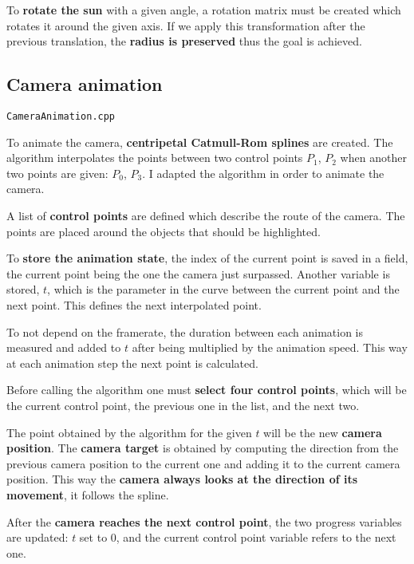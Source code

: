 To \textbf{rotate the sun }with a given angle, a rotation matrix must be created which rotates it around the given axis. If we apply this transformation after the previous translation, the \textbf{radius is preserved} thus the goal is achieved.







\subsection{Camera animation}

\verb|CameraAnimation.cpp|

To animate the camera, \textbf{centripetal Catmull-Rom splines} \cite{splineCatmullRom} are created. The algorithm interpolates the points between two control points $P_1$, $P_2$ when another two points are given: $P_0$, $P_3$. I adapted the algorithm in order to animate the camera. 

A list of \textbf{control points} are defined which describe the route of the camera. The points are placed around the objects that should be highlighted.

To \textbf{store the animation state}, the index of the current point is saved in a field, the current point being the one the camera just surpassed. Another variable is stored, $t$, which is the parameter in the curve between the current point and the next point. This defines the next interpolated point.

To not depend on the framerate, the duration between each animation is measured and added to $t$ after being multiplied by the animation speed. This way at each animation step the next point is calculated.

Before calling the algorithm one must \textbf{select four control points}, which will be the current control point, the previous one in the list, and the next two.

The point obtained by the algorithm for the given $t$ will be the new \textbf{camera position}. The \textbf{camera target} is obtained by computing the direction from the previous camera position to the current one and adding it to the current camera position. This way the \textbf{camera always looks at the direction of its movement}, it follows the spline.

After the \textbf{camera reaches the next control point}, the two progress variables are updated: $t$ set to 0, and the current control point variable refers to the next one.





